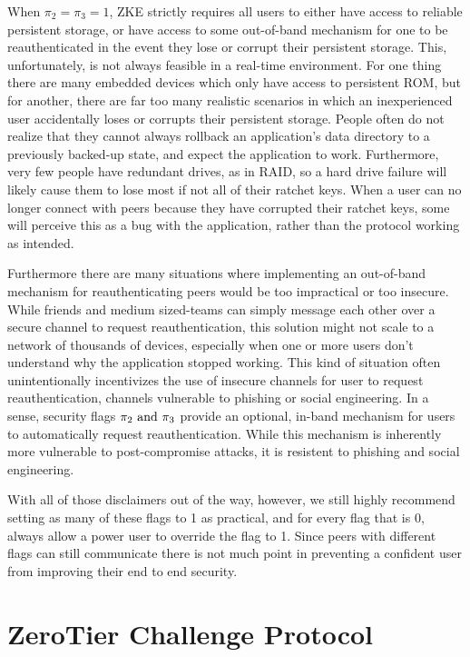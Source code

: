 \documentclass{article}
\begin{document}
When $\pi_2 = \pi_3 = 1$, ZKE strictly requires all users to either have access to reliable persistent storage, or have access to some out-of-band mechanism for one to be reauthenticated in the event they lose or corrupt their persistent storage. This, unfortunately, is not always feasible in a real-time environment. For one thing there are many embedded devices which only have access to persistent ROM, but for another, there are far too many realistic scenarios in which an inexperienced user accidentally loses or corrupts their persistent storage. People often do not realize that they cannot always rollback an application's data directory to a previously backed-up state, and expect the application to work. Furthermore, very few people have redundant drives, as in RAID, so a hard drive failure will likely cause them to lose most if not all of their ratchet keys. When a user can no longer connect with peers because they have corrupted their ratchet keys, some will perceive this as a bug with the application, rather than the protocol working as intended.

Furthermore there are many situations where implementing an out-of-band mechanism for reauthenticating peers would be too impractical or too insecure. While friends and medium sized-teams can simply message each other over a secure channel to request reauthentication, this solution might not scale to a network of thousands of devices, especially when one or more users don't understand why the application stopped working. This kind of situation often unintentionally incentivizes the use of insecure channels for user to request reauthentication, channels vulnerable to phishing or social engineering. In a sense, security flags $\pi_2 \text{ and } \pi_3$ provide an optional, in-band mechanism for users to automatically request reauthentication. While this mechanism is inherently more vulnerable to post-compromise attacks, it is resistent to phishing and social engineering.

With all of those disclaimers out of the way, however, we still highly recommend setting as many of these flags to 1 as practical, and for every flag that is 0, always allow a power user to override the flag to 1. Since peers with different flags can still communicate there is not much point in preventing a confident user from improving their end to end security.

\section{ZeroTier Challenge Protocol}
\end{document}
